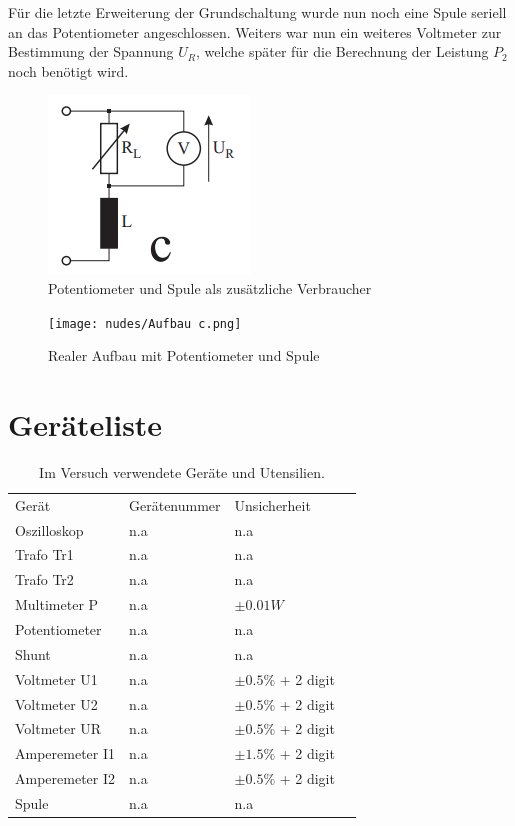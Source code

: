 \documentclass[12pt,a4paper,twoside]{article}
\begin{document}
\noindent
Für die letzte Erweiterung der Grundschaltung wurde nun noch eine Spule seriell an das Potentiometer angeschlossen. Weiters war nun ein weiteres Voltmeter zur Bestimmung der Spannung $U_{R}$, welche später für die Berechnung der Leistung $P_{2}$ noch benötigt wird.

\begin{figure}[H]
    \centering
    \includegraphics[width=0.2\linewidth, angle=0]{nudes/Versuchsaufbau c.png}
    \caption{Potentiometer und Spule als zusätzliche Verbraucher}
    \label{fig:AufbauC}
\end{figure}

\begin{figure}[H]
    \centering
    \texttt{[image: nudes/Aufbau c.png]}
    \caption{Realer Aufbau mit Potentiometer und Spule}
    \label{fig:RealerAufbauC}
\end{figure}



\section{Geräteliste} %

    \begin{table}[H]
        \centering
        \caption{Im Versuch verwendete Geräte und Utensilien.}
        \label{tab:geraete}
        \begin{tabular}{| l | l | l | l |}
            \hline
            Gerät & Gerätenummer  & Unsicherheit \\
            Oszilloskop & {n.a} & {n.a} \\
            Trafo Tr1 & {n.a} & {n.a} \\
            Trafo Tr2 & {n.a} & {n.a} \\
            Multimeter P & {n.a} & $\pm 0.01 W$ \cite{leybold}\\
            Potentiometer & {n.a} & {n.a} \\
            Shunt & {n.a} & {n.a} \\
            Voltmeter U1 & {n.a} & $\pm 0.5\%$ + 2 digit \\
            Voltmeter U2 & {n.a} & $\pm 0.5\%$ + 2 digit \\
            Voltmeter UR & {n.a} & $\pm 0.5\%$ + 2 digit \\
            Amperemeter I1 & {n.a} & $\pm 1.5\%$ + 2 digit \\
            Amperemeter I2 & {n.a} & $\pm 0.5\%$ + 2 digit \\
            Spule & {n.a} & {n.a} \\
            \hline
        \end{tabular}
    \end{table}
\end{document}
